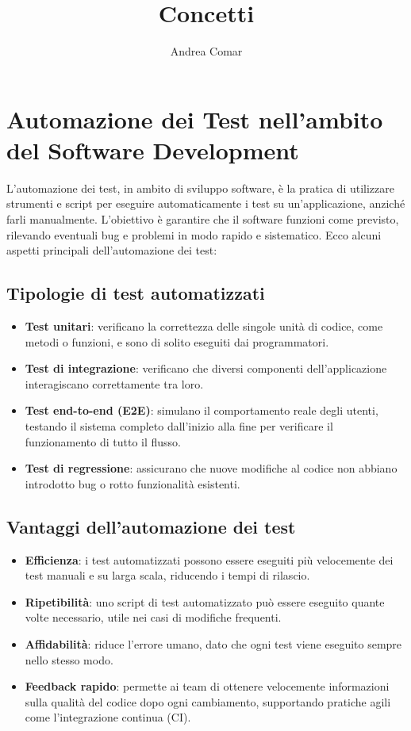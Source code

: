 \documentclass{article}
\title{Concetti}
\author{Andrea Comar}
\begin{document}
\maketitle
\tableofcontents


\section{Automazione dei Test nell'ambito del Software Development}

L'automazione dei test, in ambito di sviluppo software, è la pratica di utilizzare strumenti e script per eseguire automaticamente i test su un'applicazione, anziché farli manualmente. L'obiettivo è garantire che il software funzioni come previsto, rilevando eventuali bug e problemi in modo rapido e sistematico. Ecco alcuni aspetti principali dell'automazione dei test:

\subsection{Tipologie di test automatizzati}
\begin{itemize}
    \item \textbf{Test unitari}: verificano la correttezza delle singole unità di codice, come metodi o funzioni, e sono di solito eseguiti dai programmatori.
    \item \textbf{Test di integrazione}: verificano che diversi componenti dell’applicazione interagiscano correttamente tra loro.
    \item \textbf{Test end-to-end (E2E)}: simulano il comportamento reale degli utenti, testando il sistema completo dall’inizio alla fine per verificare il funzionamento di tutto il flusso.
    \item \textbf{Test di regressione}: assicurano che nuove modifiche al codice non abbiano introdotto bug o rotto funzionalità esistenti.
\end{itemize}

\subsection{Vantaggi dell'automazione dei test}
\begin{itemize}
    \item \textbf{Efficienza}: i test automatizzati possono essere eseguiti più velocemente dei test manuali e su larga scala, riducendo i tempi di rilascio.
    \item \textbf{Ripetibilità}: uno script di test automatizzato può essere eseguito quante volte necessario, utile nei casi di modifiche frequenti.
    \item \textbf{Affidabilità}: riduce l'errore umano, dato che ogni test viene eseguito sempre nello stesso modo.
    \item \textbf{Feedback rapido}: permette ai team di ottenere velocemente informazioni sulla qualità del codice dopo ogni cambiamento, supportando pratiche agili come l'integrazione continua (CI).
\end{itemize}
\end{document}
